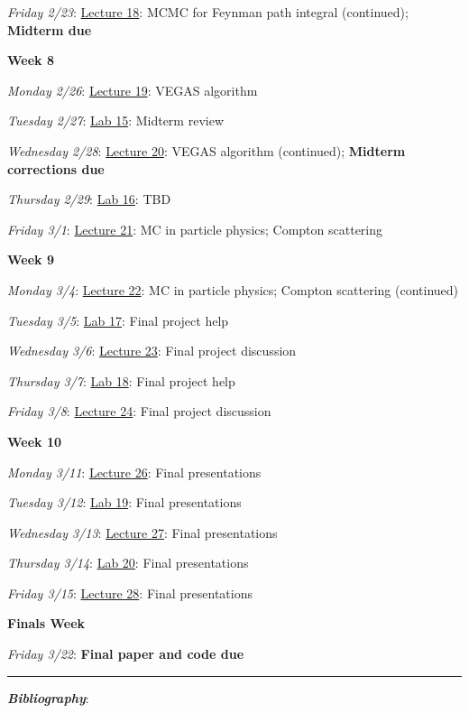 \documentclass[12pt]{article}
\begin{document}
\emph{Friday 2/23}: \underline{Lecture 18}: MCMC for Feynman path integral (continued); \textbf{Midterm due}

\noindent\textbf{Week 8}

\emph{Monday 2/26}: \underline{Lecture 19}: VEGAS algorithm

\emph{Tuesday 2/27}: \underline{Lab 15}: Midterm review

\emph{Wednesday 2/28}: \underline{Lecture 20}: VEGAS algorithm (continued); \textbf{Midterm corrections due}

\emph{Thursday 2/29}: \underline{Lab 16}: TBD

\emph{Friday 3/1}: \underline{Lecture 21}: MC in particle physics; Compton scattering

\noindent\textbf{Week 9}

\emph{Monday 3/4}: \underline{Lecture 22}: MC in particle physics; Compton scattering (continued)

\emph{Tuesday 3/5}: \underline{Lab 17}: Final project help

\emph{Wednesday 3/6}: \underline{Lecture 23}: Final project discussion

\emph{Thursday 3/7}: \underline{Lab 18}: Final project help

\emph{Friday 3/8}: \underline{Lecture 24}: Final project discussion

\noindent\textbf{Week 10}

\emph{Monday 3/11}: \underline{Lecture 26}: Final presentations

\emph{Tuesday 3/12}: \underline{Lab 19}: Final presentations

\emph{Wednesday 3/13}: \underline{Lecture 27}: Final presentations

\emph{Thursday 3/14}: \underline{Lab 20}: Final presentations

\emph{Friday 3/15}: \underline{Lecture 28}: Final presentations

\noindent\textbf{Finals Week}

\emph{Friday 3/22}: \textbf{Final paper and code due}

\begin{center}
  \rule{\textwidth}{0.5pt}
\end{center}
\nocite{*}

\noindent\textbf{\emph{Bibliography}}:\\
\printbibliography[heading=none]
\end{document}
